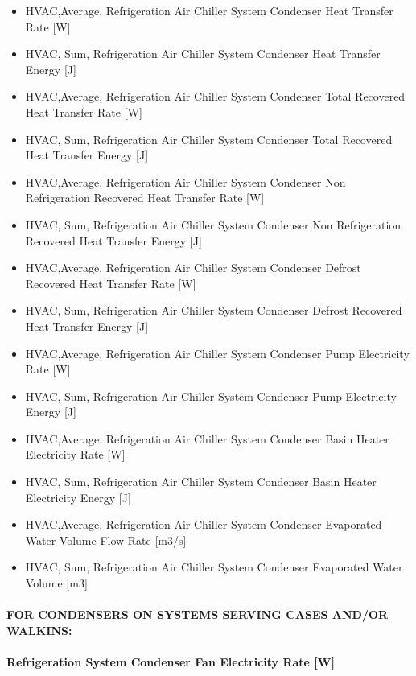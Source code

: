 \begin{itemize}
\item
  HVAC,Average, Refrigeration Air Chiller System Condenser Heat Transfer Rate {[}W{]}
\item
  HVAC, Sum, Refrigeration Air Chiller System Condenser Heat Transfer Energy {[}J{]}
\item
  HVAC,Average, Refrigeration Air Chiller System Condenser Total Recovered Heat Transfer Rate {[}W{]}
\item
  HVAC, Sum, Refrigeration Air Chiller System Condenser Total Recovered Heat Transfer Energy {[}J{]}
\item
  HVAC,Average, Refrigeration Air Chiller System Condenser Non Refrigeration Recovered Heat Transfer Rate {[}W{]}
\item
  HVAC, Sum, Refrigeration Air Chiller System Condenser Non Refrigeration Recovered Heat Transfer Energy {[}J{]}
\item
  HVAC,Average, Refrigeration Air Chiller System Condenser Defrost Recovered Heat Transfer Rate {[}W{]}
\item
  HVAC, Sum, Refrigeration Air Chiller System Condenser Defrost Recovered Heat Transfer Energy {[}J{]}
\item
  HVAC,Average, Refrigeration Air Chiller System Condenser Pump Electricity Rate {[}W{]}
\item
  HVAC, Sum, Refrigeration Air Chiller System Condenser Pump Electricity Energy {[}J{]}
\item
  HVAC,Average, Refrigeration Air Chiller System Condenser Basin Heater Electricity Rate {[}W{]}
\item
  HVAC, Sum, Refrigeration Air Chiller System Condenser Basin Heater Electricity Energy {[}J{]}
\item
  HVAC,Average, Refrigeration Air Chiller System Condenser Evaporated Water Volume Flow Rate {[}m3/s{]}
\item
  HVAC, Sum, Refrigeration Air Chiller System Condenser Evaporated Water Volume {[}m3{]}
\end{itemize}

\paragraph{FOR CONDENSERS ON SYSTEMS SERVING CASES AND/OR WALKINS:}\label{for-condensers-on-systems-serving-cases-andor-walkins-1}

\paragraph{Refrigeration System Condenser Fan Electricity Rate {[}W{]}}\label{refrigeration-system-condenser-fan-electric-power-w-1}

